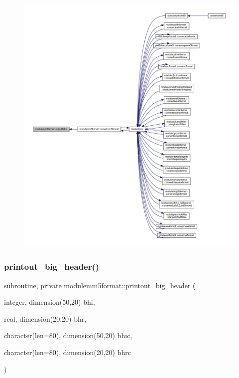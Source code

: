 \begin{figure}[H]
\begin{center}
\leavevmode
\includegraphics[width=350pt]{namespacemodulemm5format_a3cfd45468121f8166d1e004ee05a5b0b_icgraph}
\end{center}
\end{figure}
\mbox{\label{namespacemodulemm5format_a406c18c9d5a54d074a43f1f1252ebdde}} 
\subsubsection{\texorpdfstring{printout\+\_\+big\+\_\+header()}{printout\_big\_header()}}
{\footnotesize\ttfamily subroutine, private modulemm5format\+::printout\+\_\+big\+\_\+header (\begin{DoxyParamCaption}\item[{integer, dimension(50,20)}]{bhi,  }\item[{real, dimension(20,20)}]{bhr,  }\item[{character(len=80), dimension(50,20)}]{bhic,  }\item[{character(len=80), dimension(20,20)}]{bhrc }\end{DoxyParamCaption})\hspace{0.3cm}{\ttfamily [private]}}

